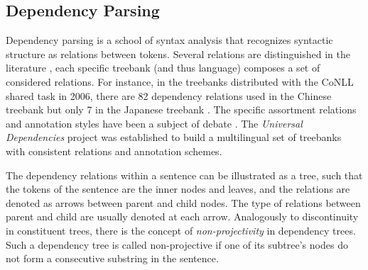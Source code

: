\documentclass[../document.tex]{subfiles}
\begin{document}
    \subsection{Dependency Parsing}
    Dependency parsing is a school of syntax analysis that recognizes syntactic structure as relations between tokens.
    Several relations are distinguished in the literature \citep[Table~3 shows the list of dependency relations annotated in the Universal Dependencies treebanks]{de2021universal}, each specific treebank (and thus language) composes a set of considered relations.
    For instance, in the treebanks distributed with the CoNLL shared task in 2006, there are 82 dependency relations used in the Chinese treebank but only 7 in the Japanese treebank \citep[Table~1]{buchholz2006conll}.
    The specific assortment relations and annotation styles have been a subject of debate \citep{Gerdes2016DependencyAC,Rehbein2017UniversalDA,osborne2019status}.
    The \emph{Universal Dependencies} project \citep{de2021universal} was established to build a multilingual set of treebanks with consistent relations and annotation schemes.

    The dependency relations within a sentence can be illustrated as a tree, such that the tokens of the sentence are the inner nodes and leaves, and the relations are denoted as arrows between parent and child nodes.
    The type of relations between parent and child are usually denoted at each arrow.
    Analogously to discontinuity in constituent trees, there is the concept of \emph{non-projectivity} in dependency trees.
    Such a dependency tree is called non-projective if one of its subtree's nodes do not form a consecutive substring in the sentence.
\end{document}
